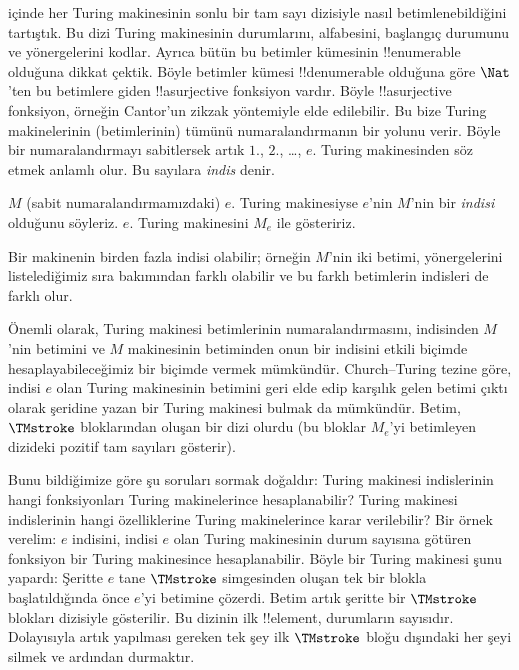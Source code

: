 


 içinde her Turing makinesinin sonlu bir tam sayı dizisiyle
nasıl betimlenebildiğini tartıştık. Bu dizi Turing makinesinin durumlarını,
alfabesini, başlangıç durumunu ve yönergelerini kodlar. Ayrıca bütün bu
betimler kümesinin !!{enumerable} olduğuna dikkat çektik. Böyle betimler
kümesi !!{denumerable} olduğuna göre $\Nat$'ten bu betimlere giden
!!a{surjective} fonksiyon vardır. Böyle !!a{surjective} fonksiyon, örneğin
Cantor'un zikzak yöntemiyle elde edilebilir. Bu bize Turing makinelerinin
(betimlerinin) tümünü numaralandırmanın bir yolunu verir. Böyle bir
numaralandırmayı sabitlersek artık $1$., $2$., \dots, $e$. Turing
makinesinden söz etmek anlamlı olur. Bu sayılara \emph{indis} denir.

\begin{defn}
$M$ (sabit numaralandırmamızdaki) $e$. Turing makinesiyse $e$'nin $M$'nin bir
\emph{indisi} olduğunu söyleriz. $e$. Turing makinesini $M_e$ ile gösteririz.
\end{defn}

Bir makinenin birden fazla indisi olabilir; örneğin $M$'nin iki betimi,
yönergelerini listelediğimiz sıra bakımından farklı olabilir ve bu farklı
betimlerin indisleri de farklı olur.

Önemli olarak, Turing makinesi betimlerinin numaralandırmasını, indisinden
$M$'nin betimini ve $M$ makinesinin betiminden onun bir indisini etkili
biçimde hesaplayabileceğimiz bir biçimde vermek mümkündür. Church--Turing
tezine göre, indisi $e$ olan Turing makinesinin betimini geri elde edip karşılık
gelen betimi çıktı olarak şeridine yazan bir Turing makinesi bulmak da
mümkündür. Betim, $\TMstroke$ bloklarından oluşan bir dizi olurdu (bu bloklar
$M_e$'yi betimleyen dizideki pozitif tam sayıları gösterir).

Bunu bildiğimize göre şu soruları sormak doğaldır: Turing makinesi
indislerinin hangi fonksiyonları Turing makinelerince hesaplanabilir? Turing
makinesi indislerinin hangi özelliklerine Turing makinelerince karar
verilebilir? Bir örnek verelim: $e$ indisini, indisi $e$ olan Turing
makinesinin durum sayısına götüren fonksiyon bir Turing makinesince
hesaplanabilir. Böyle bir Turing makinesi şunu yapardı: Şeritte $e$ tane
$\TMstroke$ simgesinden oluşan tek bir blokla başlatıldığında önce $e$'yi
betimine çözerdi. Betim artık şeritte bir $\TMstroke$ blokları dizisiyle
gösterilir. Bu dizinin ilk !!{element}, durumların sayısıdır. Dolayısıyla
artık yapılması gereken tek şey ilk $\TMstroke$ bloğu dışındaki her şeyi
silmek ve ardından durmaktır.

